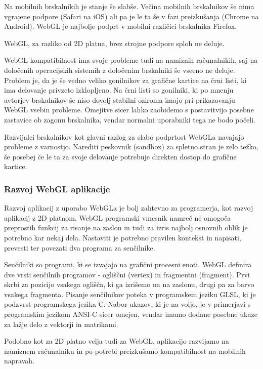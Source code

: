 Na mobilnih brskalnikih je stanje še slabše. Večina mobilnih brskalnikov še nima vgrajene podpore (Safari na iOS) ali pa je le ta še v fazi preizkušanja (Chrome na Android). WebGL je najbolje podprt v mobilni različici brskalnika Firefox.

WebGL, za razliko od 2D platna, brez strojne podpore sploh ne deluje. 

WebGL kompatibilnost ima svoje probleme tudi na namiznih računalnikih, saj na določenih operacijskih sistemih z določenim brskalniki še vseeno ne deluje. Problem je, da je še vedno veliko gonilnikov za grafične kartice na črni listi, ki ima delovanje privzeto izklopljeno. Na črni listi so gonilniki, ki po mnenju avtorjev brskalnikov še niso dovolj stabilni oziroma imajo pri prikazovanju WebGL vsebin probleme. Omejitve sicer lahko zaobidemo s postavitvijo posebne zastavice ob zagonu brskalnika, vendar normalni uporabniki tega ne bodo počeli.

Razvijalci brskalnikov kot glavni razlog za slabo podprtost WebGLa navajajo probleme z varnostjo. Narediti peskovnik (sandbox) za spletno stran je zelo težko, še posebej če le ta za svoje delovanje potrebuje direkten dostop do grafične kartice.

\subsubsection{Razvoj WebGL aplikacije}

Razvoj aplikacij z uporabo WebGLa je bolj zahtevno za programerja, kot razvoj aplikacij z 2D platnom. WebGL programski vmesnik namreč ne omogoča preprostih funkcij za risanje na zaslon in tudi za izris najbolj osnovnih oblik je potrebno kar nekaj dela. Nastaviti je potrebno pravilen kontekst in napisati, prevesti ter povezati dva programa za senčilnike. 

Senčilniki so programi, ki se izvajajo na grafični procesni enoti. WebGL definira dve vrsti senčilnih programov - ogliščni (vertex) in fragmentni (fragment). Prvi skrbi za pozicijo vsakega oglišča, ki ga izrišemo na na zaslonu, drugi pa za barvo vsakega fragmenta. Pisanje senčilnikov poteka v programskem jeziku GLSL, ki je podzvrst programskega jezika C. Nabor ukazov, ki je na voljo, je v primerjavi s programskim jezikom ANSI-C sicer omejen, vendar imamo dodane posebne ukaze za lažje delo z vektorji in matrikami.

Podobno kot za 2D platno velja tudi za WebGL, aplikacijo razvijamo na namiznem računalniku in po potrebi preizkušamo kompatibilnost na mobilnih napravah.

